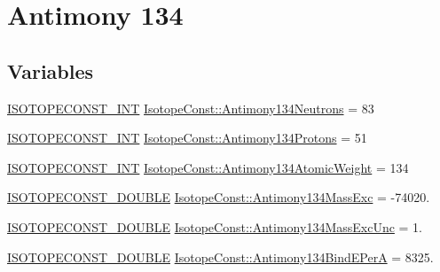 \hypertarget{group___isotope_const-_antimony-_sb134}{}\section{Antimony 134}
\label{group___isotope_const-_antimony-_sb134}
\subsection*{Variables}
\begin{DoxyCompactItemize}
\item 
\mbox{\hyperlink{group___isotope_const-_macros_ga5f18360b3e99483a35c32d789e62621c}{I\+S\+O\+T\+O\+P\+E\+C\+O\+N\+S\+T\+\_\+\+I\+NT}} \mbox{\hyperlink{group___isotope_const-_antimony-_sb134_ga343896b20b398c028597367e12175b64}{Isotope\+Const\+::\+Antimony134\+Neutrons}} = 83
\item 
\mbox{\hyperlink{group___isotope_const-_macros_ga5f18360b3e99483a35c32d789e62621c}{I\+S\+O\+T\+O\+P\+E\+C\+O\+N\+S\+T\+\_\+\+I\+NT}} \mbox{\hyperlink{group___isotope_const-_antimony-_sb134_gaeaa3a28e4d0517948fd53223194ff0a3}{Isotope\+Const\+::\+Antimony134\+Protons}} = 51
\item 
\mbox{\hyperlink{group___isotope_const-_macros_ga5f18360b3e99483a35c32d789e62621c}{I\+S\+O\+T\+O\+P\+E\+C\+O\+N\+S\+T\+\_\+\+I\+NT}} \mbox{\hyperlink{group___isotope_const-_antimony-_sb134_ga4d8d1c7bb08da642f96e2723fc1b78b9}{Isotope\+Const\+::\+Antimony134\+Atomic\+Weight}} = 134
\item 
\mbox{\hyperlink{group___isotope_const-_macros_ga8f45a7272ce02c0b4c65c44636ed719a}{I\+S\+O\+T\+O\+P\+E\+C\+O\+N\+S\+T\+\_\+\+D\+O\+U\+B\+LE}} \mbox{\hyperlink{group___isotope_const-_antimony-_sb134_ga63c47f3c02167f5a3d7d6657c0027680}{Isotope\+Const\+::\+Antimony134\+Mass\+Exc}} = -\/74020.
\item 
\mbox{\hyperlink{group___isotope_const-_macros_ga8f45a7272ce02c0b4c65c44636ed719a}{I\+S\+O\+T\+O\+P\+E\+C\+O\+N\+S\+T\+\_\+\+D\+O\+U\+B\+LE}} \mbox{\hyperlink{group___isotope_const-_antimony-_sb134_ga02f2018869cf02b915f73c8de83f95c9}{Isotope\+Const\+::\+Antimony134\+Mass\+Exc\+Unc}} = 1.
\item 
\mbox{\hyperlink{group___isotope_const-_macros_ga8f45a7272ce02c0b4c65c44636ed719a}{I\+S\+O\+T\+O\+P\+E\+C\+O\+N\+S\+T\+\_\+\+D\+O\+U\+B\+LE}} \mbox{\hyperlink{group___isotope_const-_antimony-_sb134_ga69a59da4c14e00942bdfa6a71e2208ee}{Isotope\+Const\+::\+Antimony134\+Bind\+E\+PerA}} = 8325.
\item 

\end{DoxyCompactItemize}
